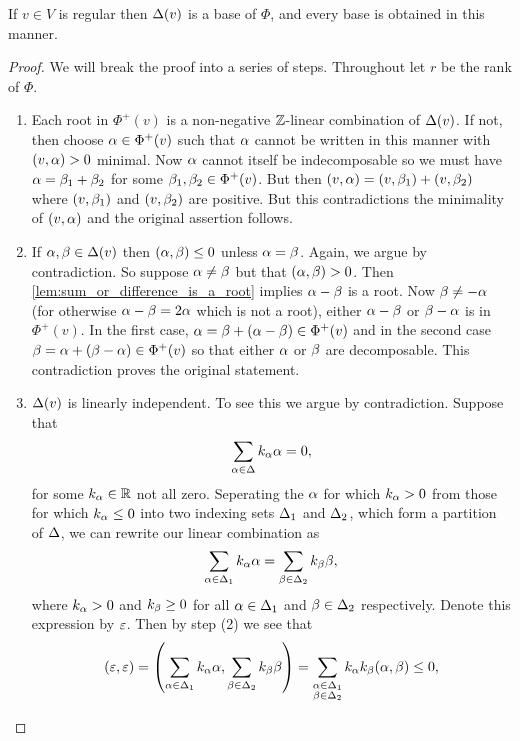 \documentclass[12pt,reqno,oneside]{amsart}
\begin{document}
    \begin{theorem}\label{thm:root_system_base}
        If $v \in V$ is regular then $\Delta(v)$ is a base of $\Phi$, and every base is obtained in this manner.
    \end{theorem}
    \begin{proof}
        We will break the proof into a series of steps. Throughout let $r$ be the rank of $\Phi$.
        \begin{enumerate}
            \item Each root in $\Phi^{+}(v)$ is a non-negative $\mathbb{Z}$-linear combination of $\Delta(v)$. If not, then choose $\alpha \in \Phi^{+}(v)$ such that $\alpha$ cannot be written in this manner with $(v,\alpha) > 0$ minimal. Now $\alpha$ cannot itself be indecomposable so we must have $\alpha = \beta_{1}+\beta_{2}$ for some $\beta_{1},\beta_{2} \in \Phi^{+}(v)$. But then $(v,\alpha) = (v,\beta_{1})+(v,\beta_{2})$ where $(v,\beta_{1})$ and $(v,\beta_{2})$ are positive. But this contradictions the minimality of $(v,\alpha)$ and the original assertion follows.
            \item If $\alpha,\beta \in \Delta(v)$ then $(\alpha,\beta) \le 0$ unless $\alpha = \beta$. Again, we argue by contradiction. So suppose $\alpha \neq \beta$ but that $(\alpha,\beta) > 0$. Then \cref{lem:sum_or_difference_is_a_root} implies $\alpha-\beta$ is a root. Now $\beta \neq -\alpha$ (for otherwise $\alpha-\beta = 2\alpha$ which is not a root), either $\alpha-\beta$ or $\beta-\alpha$ is in $\Phi^{+}(v)$. In the first case, $\alpha = \beta+(\alpha-\beta) \in \Phi^{+}(v)$ and in the second case $\beta = \alpha+(\beta-\alpha) \in \Phi^{+}(v)$ so that either $\alpha$ or $\beta$ are decomposable. This contradiction proves the original statement.
            \item $\Delta(v)$ is linearly independent. To see this we argue by contradiction. Suppose that
            \[
                \sum_{\alpha \in \Delta}k_{\alpha}\alpha = 0,
            \]
            for some $k_{\alpha} \in \mathbb{R}$ not all zero. Seperating the $\alpha$ for which $k_{\alpha} > 0$ from those for which $k_{\alpha} \le 0$ into two indexing sets $\Delta_{1}$ and $\Delta_{2}$, which form a partition of $\Delta$, we can rewrite our linear combination as
            \[
                \sum_{\alpha \in \Delta_{1}}k_{\alpha}\alpha = \sum_{\beta \in \Delta_{2}}k_{\beta}\beta,
            \]
            where $k_{\alpha} > 0$ and $k_{\beta} \ge 0$ for all $\alpha \in \Delta_{1}$ and $\beta \in \Delta_{2}$ respectively. Denote this expression by $\varepsilon$. Then by step (2) we see that
            \[
                (\varepsilon,\varepsilon) = \left(\sum_{\alpha \in \Delta_{1}}k_{\alpha}\alpha,\sum_{\beta \in \Delta_{2}}k_{\beta}\beta\right) = \sum_{\substack{\alpha \in \Delta_{1} \\ \beta \in \Delta_{2}}}k_{\alpha}k_{\beta}(\alpha,\beta) \le 0,
            \]

\end{enumerate}
\end{proof}
\end{document}
